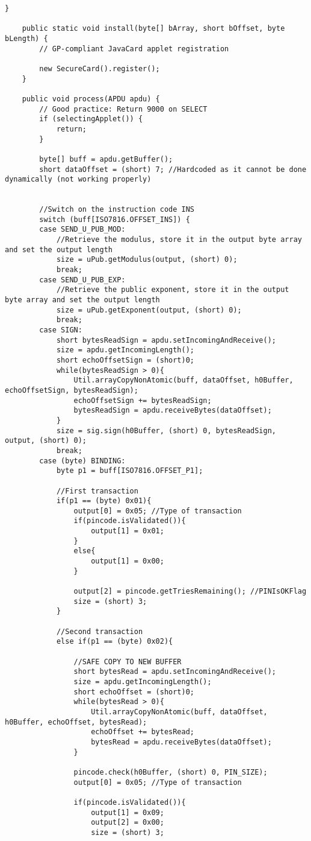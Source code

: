 \begin{lstlisting}[caption=SecureCard.java.,breaklines=true,breakatwhitespace=false, label=lst:SecureCard,escapechar=!]
	}

	public static void install(byte[] bArray, short bOffset, byte bLength) {
		// GP-compliant JavaCard applet registration

		new SecureCard().register();
	}

	public void process(APDU apdu) {
		// Good practice: Return 9000 on SELECT
		if (selectingApplet()) {
			return;
		}

		byte[] buff = apdu.getBuffer();
		short dataOffset = (short) 7; //Hardcoded as it cannot be done dynamically (not working properly)


		//Switch on the instruction code INS
		switch (buff[ISO7816.OFFSET_INS]) {
		case SEND_U_PUB_MOD:
			//Retrieve the modulus, store it in the output byte array and set the output length
			size = uPub.getModulus(output, (short) 0);
		    break;
		case SEND_U_PUB_EXP:
			//Retrieve the public exponent, store it in the output byte array and set the output length
			size = uPub.getExponent(output, (short) 0);
			break;
		case SIGN:
			short bytesReadSign = apdu.setIncomingAndReceive();
			size = apdu.getIncomingLength();
			short echoOffsetSign = (short)0;
			while(bytesReadSign > 0){
				Util.arrayCopyNonAtomic(buff, dataOffset, h0Buffer, echoOffsetSign, bytesReadSign);
				echoOffsetSign += bytesReadSign;
				bytesReadSign = apdu.receiveBytes(dataOffset);
			}
			size = sig.sign(h0Buffer, (short) 0, bytesReadSign, output, (short) 0);
			break;
		case (byte) BINDING:
			byte p1 = buff[ISO7816.OFFSET_P1];

			//First transaction
			if(p1 == (byte) 0x01){
				output[0] = 0x05; //Type of transaction
				if(pincode.isValidated()){
					output[1] = 0x01;
				}
				else{
					output[1] = 0x00;
				}

				output[2] = pincode.getTriesRemaining(); //PINIsOKFlag
				size = (short) 3;
			}

			//Second transaction
			else if(p1 == (byte) 0x02){

				//SAFE COPY TO NEW BUFFER
				short bytesRead = apdu.setIncomingAndReceive();
				size = apdu.getIncomingLength();
				short echoOffset = (short)0;
				while(bytesRead > 0){
					Util.arrayCopyNonAtomic(buff, dataOffset, h0Buffer, echoOffset, bytesRead);
					echoOffset += bytesRead;
		            bytesRead = apdu.receiveBytes(dataOffset);
				}

				pincode.check(h0Buffer, (short) 0, PIN_SIZE);
				output[0] = 0x05; //Type of transaction

				if(pincode.isValidated()){
					output[1] = 0x09;
					output[2] = 0x00;
					size = (short) 3;


\end{lstlisting}
